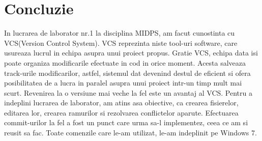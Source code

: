 \documentclass[11pt]{article}
\begin{document}
\clearpage
\section*{Concluzie}

In lucrarea de laborator nr.1 la disciplina MIDPS, am facut cunostinta
cu VCS(Version Control System). VCS reprezinta niste tool-uri software,
care usureaza lucrul in echipa asupra unui proiect propus.
Gratie VCS, echipa data isi poate organiza modificarile efectuate in cod
in orice moment. Acesta salveaza track-urile modificarilor, astfel, sistemul dat
devenind destul de eficient si ofera posibilitatea de a lucra in paralel asupra
unui proiect intr-un timp mult mai scurt.
Revenirea la o versiune mai veche la fel este un avantaj al VCS.
Pentru a indeplini lucrarea de laborator, am atins asa obiective, ca crearea fisierelor,
editarea lor, crearea ramurilor si rezolvarea conflictelor aparute. Efectuarea commit-urilor
la fel a fost un punct care urma sa-l implementez, ceea ce am si reusit sa fac.
Toate comenzile care le-am utilizat, le-am indeplinit pe Windows 7.

\clearpage
\end{document}
